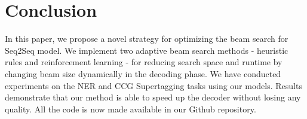 \documentclass[11pt,a4paper]{article}
\begin{document}









\section{Conclusion} \label{sec:conclusion}
In this paper, we propose a novel strategy for optimizing the beam search for Seq2Seq model. We implement two adaptive beam search methods - heuristic rules and reinforcement learning - for reducing search space and runtime by changing beam size dynamically in the decoding phase. We have conducted experiments on the NER and CCG Supertagging tasks using our models. Results demonstrate that our method is able to speed up the decoder without losing any quality. All the code is now made available in our Github repository. 
\end{document}
